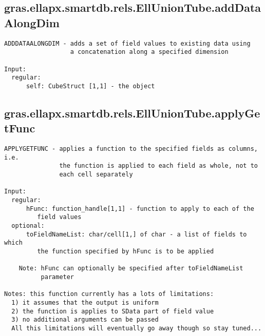 \subsection{\texorpdfstring{gras.ellapx.smartdb.rels.EllUnionTube.addDataAlongDim}{addDataAlongDim}}\label{method:gras.ellapx.smartdb.rels.EllUnionTube.addDataAlongDim}
\begin{verbatim}
ADDDATAALONGDIM - adds a set of field values to existing data using
                  a concatenation along a specified dimension

Input:
  regular:
      self: CubeStruct [1,1] - the object
\end{verbatim}
\subsection{\texorpdfstring{gras.ellapx.smartdb.rels.EllUnionTube.applyGetFunc}{applyGetFunc}}\label{method:gras.ellapx.smartdb.rels.EllUnionTube.applyGetFunc}
\begin{verbatim}
APPLYGETFUNC - applies a function to the specified fields as columns, i.e.
               the function is applied to each field as whole, not to
               each cell separately

Input:
  regular:
      hFunc: function_handle[1,1] - function to apply to each of the
         field values
  optional:
      toFieldNameList: char/cell[1,] of char - a list of fields to which
         the function specified by hFunc is to be applied

    Note: hFunc can optionally be specified after toFieldNameList
          parameter

Notes: this function currently has a lots of limitations:
  1) it assumes that the output is uniform
  2) the function is applies to SData part of field value
  3) no additional arguments can be passed
  All this limitations will eventually go away though so stay tuned...
\end{verbatim}
